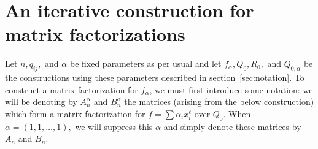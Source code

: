 \documentclass [11pt, proquest] {uwthesis}[2020/02/24]
\begin{document}
\section{An iterative construction for matrix factorizations}\label{sec:resolution-construction}
    Let $n,q_{ij},$ and $\alpha$ be fixed parameters as per usual and let $f_\alpha,Q_0, R_0,$ and $Q_{0,\alpha}$ be the constructions using these parameters described in section~\ref{sec:notation}. To construct a matrix factorization for $f_\alpha$, we must first introduce some notation: we will be denoting by 
    $A_n^\alpha$ and $B_n^\alpha$ the matrices (arising from the below construction) which form a matrix factorization for $f=\sum \alpha_ix_i^\ell$ over $Q_0$. When $\alpha=(1,1,\dots,1),$ we will suppress this $\alpha$ and simply denote these matrices by $A_n$ and $B_n$.
    
\end{document}
